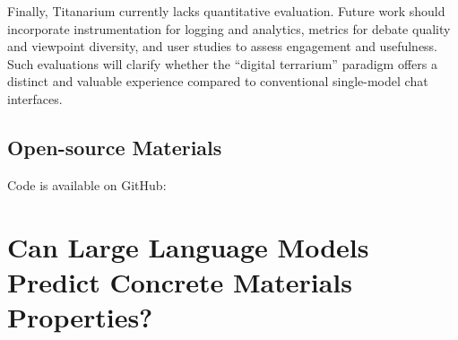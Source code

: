 Finally, Titanarium currently lacks quantitative evaluation. Future work should incorporate instrumentation for logging and analytics, metrics for debate quality and viewpoint diversity, and user studies to assess engagement and usefulness. Such evaluations will clarify whether the ``digital terrarium'' paradigm offers a distinct and valuable experience compared to conventional single-model chat interfaces.

\subsection*{Open-source Materials}
Code is available on GitHub: 








\section{Can Large Language Models Predict Concrete Materials Properties?}

%

